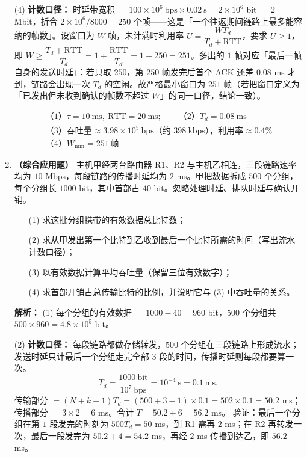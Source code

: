 \begin{enumerate}[start=7]
(4) \textbf{计数口径：} 时延带宽积 $=100\times10^{6}\ \text{bps}\times0.02\ \text{s}=2\times10^{6}$ bit $=2$ Mbit，折合 $2\times10^{6}/8000=250$ 个帧——这是「一个往返期间链路上最多能容纳的帧数」。设窗口为 $W$ 帧，未计满时利用率 $U=\dfrac{W T_d}{T_d+\text{RTT}}$，要求 $U\ge1$，即 $W\ge\dfrac{T_d+\text{RTT}}{T_d}=1+\dfrac{\text{RTT}}{T_d}=1+250=251$。多出的 $1$ 帧对应「最后一帧自身的发送时延」：若只取 $250$，第 $250$ 帧发完后首个 ACK 还差 $0.08$ ms 才到，链路会出现一次 $T_d$ 的空闲。故严格最小窗口为 $251$ 帧（若把窗口定义为「已发出但未收到确认的帧数不超过 $W$」的同一口径，结论一致）。

\[
\boxed{\begin{array}{l}
\text{（1）}\tau=10\ \text{ms},\ \text{RTT}=20\ \text{ms};\qquad \text{（2）}T_d=0.08\ \text{ms}\\[3pt]
\text{（3）吞吐量}\approx3.98\times10^{5}\ \text{bps（约 }398\ \text{kbps），利用率}\approx0.4\%\\[3pt]
\text{（4）}W_{\min}=251\ \text{帧}
\end{array}}
\]
\else \answerarea[12] \fi

\vspace{8pt}

\item \textbf{（综合应用题）} 主机甲经两台路由器 R1、R2 与主机乙相连，三段链路速率均为 $10$ Mbps，每段链路的传播时延均为 $2$ ms。甲把数据拆成 $500$ 个分组，每个分组长 $1000$ bit，其中首部占 $40$ bit。忽略处理时延、排队时延与确认开销。
\begin{enumerate}
    \item[(1)] 求这批分组携带的有效数据总比特数；
    \item[(2)] 求从甲发出第一个比特到乙收到最后一个比特所需的时间（写出流水计数口径）；
    \item[(3)] 以有效数据计算平均吞吐量（保留三位有效数字）；
    \item[(4)] 求首部开销占总传输比特的比例，并说明它与 (3) 中吞吐量的关系。
\end{enumerate}

\ifshowsolutions\par\noindent\textbf{解析：}
(1) 每个分组的有效数据 $=1000-40=960$ bit，$500$ 个分组共 $500\times960=4.8\times10^{5}$ bit。

(2) \textbf{计数口径：} 每段链路都做存储转发，$500$ 个分组在三段链路上形成流水；发送时延只计最后一个分组走完全部 $3$ 段的时间，传播时延则每段都要算一次。
\[
T_d=\frac{1000\ \text{bit}}{10^{7}\ \text{bps}}=10^{-4}\ \text{s}=0.1\ \text{ms},
\]
传输部分 $=(N+k-1)T_d=(500+3-1)\times0.1=502\times0.1=50.2$ ms；传播部分 $=3\times2=6$ ms。合计 $T=50.2+6=56.2$ ms。
验证：最后一个分组在第 $1$ 段发完的时刻为 $500T_d=50$ ms，到 R1 需再 $2$ ms；在 R2 再转发一次，最后一段发完为 $50.2+4=54.2$ ms，再经 $2$ ms 传播到达乙，即 $56.2$ ms。


\end{enumerate}
